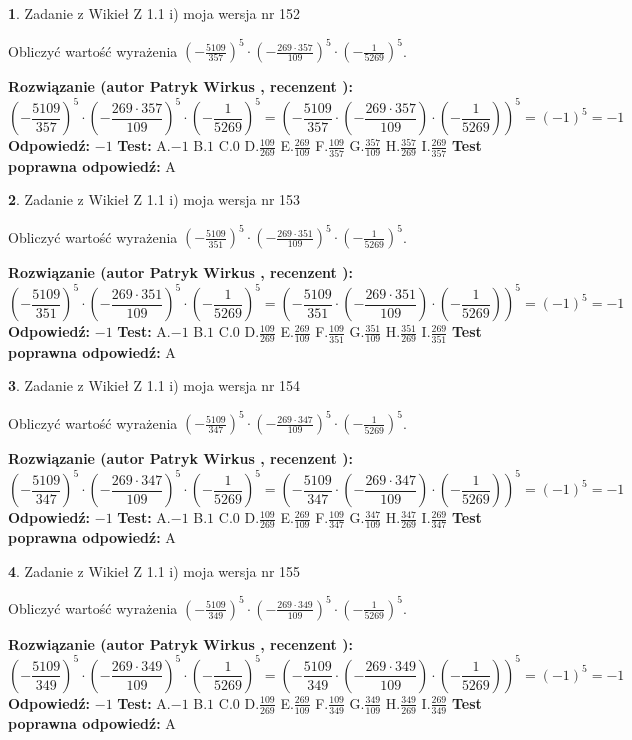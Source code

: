 \documentclass[12pt, a4paper]{article}
\theoremstyle{definition} %
\newtheorem{zad}{}
\newcommand{\zadStart}[1]{\begin{zad}#1\newline}
\newcommand{\zadStop}{\end{zad}}
\newcommand{\rozwStart}[2]{\noindent \textbf{Rozwiązanie (autor #1 , recenzent #2): }\newline}
\newcommand{\rozwStop}{\newline}
\newcommand{\odpStart}{\noindent \textbf{Odpowiedź:}\newline}
\newcommand{\odpStop}{\newline}
\newcommand{\testStart}{\noindent \textbf{Test:}\newline}
\newcommand{\testStop}{\newline}
\newcommand{\kluczStart}{\noindent \textbf{Test poprawna odpowiedź:}\newline}
\newcommand{\kluczStop}{\newline}
\begin{document}
\zadStart{Zadanie z Wikieł Z 1.1 i) moja wersja nr 152}

Obliczyć wartość wyrażenia $(-\frac{5109}{357})^{5} \cdot (-\frac{269 \cdot 357}{109})^{5} \cdot (-\frac{1}{5269})^{5}$.
\zadStop
\rozwStart{Patryk Wirkus}{}
$$(-\frac{5109}{357})^{5} \cdot (-\frac{269 \cdot 357}{109})^{5} \cdot (-\frac{1}{5269})^{5} = (-\frac{5109}{357} \cdot (-\frac{269 \cdot 357}{109}) \cdot (-\frac{1}{5269}))^{5} = (-1)^{5} = -1$$
\rozwStop
\odpStart
$-1$
\odpStop
\testStart
A.$-1$ B.$1$ C.$0$ D.$\frac{109}{269}$ E.$\frac{269}{109}$
F.$\frac{109}{357}$ G.$\frac{357}{109}$
H.$\frac{357}{269}$
I.$\frac{269}{357}$
\testStop
\kluczStart
A
\kluczStop



\zadStart{Zadanie z Wikieł Z 1.1 i) moja wersja nr 153}

Obliczyć wartość wyrażenia $(-\frac{5109}{351})^{5} \cdot (-\frac{269 \cdot 351}{109})^{5} \cdot (-\frac{1}{5269})^{5}$.
\zadStop
\rozwStart{Patryk Wirkus}{}
$$(-\frac{5109}{351})^{5} \cdot (-\frac{269 \cdot 351}{109})^{5} \cdot (-\frac{1}{5269})^{5} = (-\frac{5109}{351} \cdot (-\frac{269 \cdot 351}{109}) \cdot (-\frac{1}{5269}))^{5} = (-1)^{5} = -1$$
\rozwStop
\odpStart
$-1$
\odpStop
\testStart
A.$-1$ B.$1$ C.$0$ D.$\frac{109}{269}$ E.$\frac{269}{109}$
F.$\frac{109}{351}$ G.$\frac{351}{109}$
H.$\frac{351}{269}$
I.$\frac{269}{351}$
\testStop
\kluczStart
A
\kluczStop



\zadStart{Zadanie z Wikieł Z 1.1 i) moja wersja nr 154}

Obliczyć wartość wyrażenia $(-\frac{5109}{347})^{5} \cdot (-\frac{269 \cdot 347}{109})^{5} \cdot (-\frac{1}{5269})^{5}$.
\zadStop
\rozwStart{Patryk Wirkus}{}
$$(-\frac{5109}{347})^{5} \cdot (-\frac{269 \cdot 347}{109})^{5} \cdot (-\frac{1}{5269})^{5} = (-\frac{5109}{347} \cdot (-\frac{269 \cdot 347}{109}) \cdot (-\frac{1}{5269}))^{5} = (-1)^{5} = -1$$
\rozwStop
\odpStart
$-1$
\odpStop
\testStart
A.$-1$ B.$1$ C.$0$ D.$\frac{109}{269}$ E.$\frac{269}{109}$
F.$\frac{109}{347}$ G.$\frac{347}{109}$
H.$\frac{347}{269}$
I.$\frac{269}{347}$
\testStop
\kluczStart
A
\kluczStop



\zadStart{Zadanie z Wikieł Z 1.1 i) moja wersja nr 155}

Obliczyć wartość wyrażenia $(-\frac{5109}{349})^{5} \cdot (-\frac{269 \cdot 349}{109})^{5} \cdot (-\frac{1}{5269})^{5}$.
\zadStop
\rozwStart{Patryk Wirkus}{}
$$(-\frac{5109}{349})^{5} \cdot (-\frac{269 \cdot 349}{109})^{5} \cdot (-\frac{1}{5269})^{5} = (-\frac{5109}{349} \cdot (-\frac{269 \cdot 349}{109}) \cdot (-\frac{1}{5269}))^{5} = (-1)^{5} = -1$$
\rozwStop
\odpStart
$-1$
\odpStop
\testStart
A.$-1$ B.$1$ C.$0$ D.$\frac{109}{269}$ E.$\frac{269}{109}$
F.$\frac{109}{349}$ G.$\frac{349}{109}$
H.$\frac{349}{269}$
I.$\frac{269}{349}$
\testStop
\kluczStart
A
\kluczStop
\end{document}
